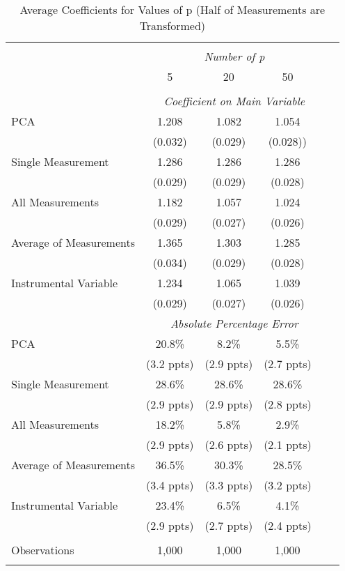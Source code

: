 \begin{table}[!htbp] \centering
  \caption{Average Coefficients for Values of p (Half of Measurements are Transformed) \label{sim_p_5_exp}}
\begin{tabular}{@{\extracolsep{5pt}}lccccc}
\\[-1.8ex]\hline
\hline \\[-1.8ex]
& \multicolumn{4}{c}{\textit{Number of p}} \
\cr \
\\[-1.8ex] & 5 & 20 & 50 \\
\hline \\[-1.8ex]
& \multicolumn{4}{c}{\textit{Coefficient on Main Variable}} \\
PCA & 1.208 & 1.082 & 1.054\\
& (0.032) & (0.029) & (0.028))\\
Single Measurement & 1.286 & 1.286 & 1.286 &  \\
& (0.029) & (0.029) & (0.028) &\\
All Measurements & 1.182 & 1.057 & 1.024  \\
  & (0.029) & (0.027) & (0.026)\\
 Average of Measurements & 1.365 & 1.303 & 1.285  \\
  & (0.034) & (0.029) & (0.028)\\
  Instrumental Variable & 1.234 & 1.065 & 1.039 \\
  & (0.029) & (0.027) & (0.026) \\
  
& \multicolumn{4}{c}{\textit{Absolute Percentage Error}} \\
PCA & 20.8\% & 8.2\% & 5.5\%  \\
& (3.2 ppts) & (2.9 ppts) & (2.7 ppts)\\
Single Measurement & 28.6\% & 28.6\% & 28.6\%  & \\
& (2.9 ppts) & (2.9 ppts) & (2.8 ppts) &\\
All Measurements & 18.2\% & 5.8\% & 2.9\%  \\
  & (2.9 ppts) & (2.6 ppts) & (2.1 ppts)\\
  Average of Measurements & 36.5\% & 30.3\% & 28.5\%  \\
  & (3.4 ppts) & (3.3 ppts) & (3.2 ppts)\\
  Instrumental Variable & 23.4\% & 6.5\% & 4.1\% \\
  & (2.9 ppts) & (2.7 ppts) & (2.4 ppts) \\
  
\hline \\[-1.8ex]
 Observations & 1,000 & 1,000 & 1,000  \\
\hline
\hline \\[-1.8ex]
\end{tabular}
\end{table}